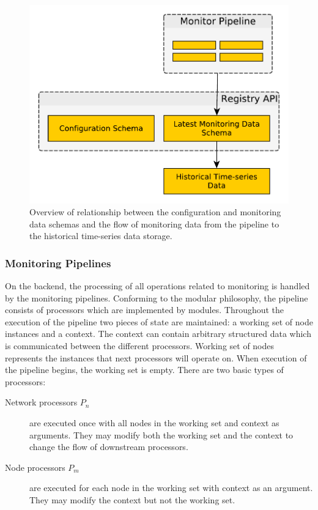 \documentclass[5p,sort&compress]{elsarticle}
\begin{document}
\begin{figure}
  \centering
  \includegraphics[scale=0.4]{figures/storage-relationships.pdf}
  \caption{Overview of relationship between the configuration and monitoring data schemas and the flow of monitoring data from the pipeline to the historical time-series data storage.}
  \label{fig:storage-relationships}
\end{figure}

\subsubsection{Monitoring Pipelines}
On the backend, the processing of all operations related to monitoring is handled by the monitoring pipelines.
Conforming to the modular philosophy, the pipeline consists of processors which are implemented by modules.
Throughout the execution of the pipeline two pieces of state are maintained: a working set of node instances and a context.
The context can contain arbitrary structured data which is communicated between the different processors.
Working set of nodes represents the instances that next processors will operate on.
When execution of the pipeline begins, the working set is empty.
There are two basic types of processors:
\begin{description}
\item[Network processors $P_n$] are executed once with all nodes in the working set and context as arguments. They may modify both the working set and the context to change the flow of downstream processors.

\item[Node processors $P_m$] are executed for each node in the working set with context as an argument. They may modify the context but not the working set.
\end{description}
\end{document}
